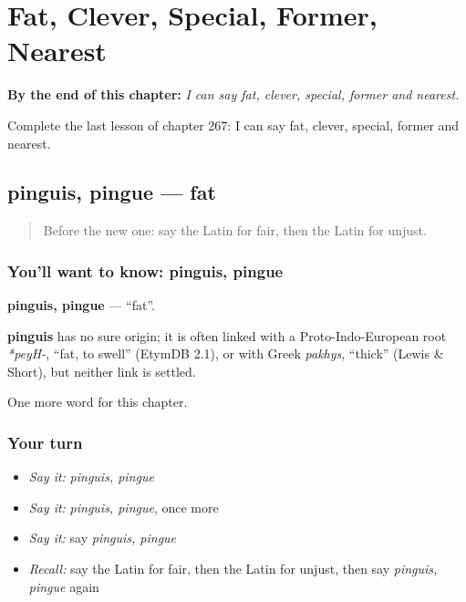 
\chapter{Fat, Clever, Special, Former, Nearest}
\label{ch:la-fat-clever-special-former-nearest}

\begin{chapteropening}
\textbf{By the end of this chapter:} \emph{I can say fat, clever, special, former and nearest.}

Complete the last lesson of chapter 267: I can say fat, clever, special, former and nearest.
\end{chapteropening}

\section[pinguis, pingue]{pinguis, pingue — fat}

\label{lesson:LA-C267-pinguis}



\begin{quote}
Before the new one: say the Latin for fair, then the Latin for unjust.
\end{quote}

\subsection*{You'll want to know: pinguis, pingue}
\textbf{pinguis, pingue} — \textquotedblleft{}fat\textquotedblright{}.

\begin{cousinweb}
\textbf{pinguis} has no sure origin; it is often linked with a Proto-Indo-European root \emph{*peyH-}, \textquotedblleft{}fat, to swell\textquotedblright{} (EtymDB 2.1), or with Greek \emph{pakhys}, \textquotedblleft{}thick\textquotedblright{} (Lewis \& Short), but neither link is settled.
\end{cousinweb}

\begin{grammarlens}[title={What you've built}]
One more word for this chapter.
\end{grammarlens}

\subsection*{Your turn}
\begin{itemize}
\raggedright
  \item \emph{Say it:} \emph{pinguis, pingue}
  \item \emph{Say it:} \emph{pinguis, pingue}, once more
  \item \emph{Say it:} say \emph{pinguis, pingue}
  \item \emph{Recall:} say the Latin for fair, then the Latin for unjust, then say \emph{pinguis, pingue} again
\end{itemize}

